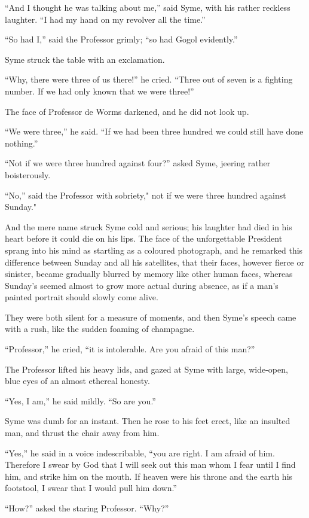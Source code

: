 \documentclass{book}
\begin{document}
“And I thought he was talking about me,” said Syme, with his rather reckless laughter. “I had my hand on my revolver all the time.”

“So had I,” said the Professor grimly; “so had Gogol evidently.”

Syme struck the table with an exclamation.

“Why, there were three of us there!” he cried. “Three out of seven is a fighting number. If we had only known that we were three!”

The face of Professor de Worms darkened, and he did not look up.

“We were three,” he said. “If we had been three hundred we could still have done nothing.”

“Not if we were three hundred against four?” asked Syme, jeering rather boisterously.

“No,” said the Professor with sobriety," not if we were three hundred against Sunday."

And the mere name struck Syme cold and serious; his laughter had died in his heart before it could die on his lips. The face of the unforgettable President sprang into his mind as startling as a coloured photograph, and he remarked this difference between Sunday and all his satellites, that their faces, however fierce or sinister, became gradually blurred by memory like other human faces, whereas Sunday’s seemed almost to grow more actual during absence, as if a man’s painted portrait should slowly come alive.

They were both silent for a measure of moments, and then Syme’s speech came with a rush, like the sudden foaming of champagne.

“Professor,” he cried, “it is intolerable. Are you afraid of this man?”

The Professor lifted his heavy lids, and gazed at Syme with large, wide-open, blue eyes of an almost ethereal honesty.

“Yes, I am,” he said mildly. “So are you.”

Syme was dumb for an instant. Then he rose to his feet erect, like an insulted man, and thrust the chair away from him.

“Yes,” he said in a voice indescribable, “you are right. I am afraid of him. Therefore I swear by God that I will seek out this man whom I fear until I find him, and strike him on the mouth. If heaven were his throne and the earth his footstool, I swear that I would pull him down.”

“How?” asked the staring Professor. “Why?”
\end{document}
